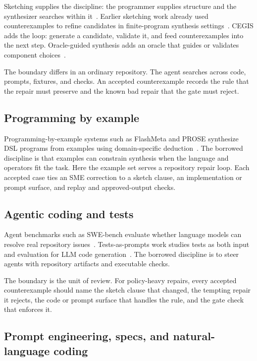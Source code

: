 \documentclass[11pt]{article}
\begin{document}
Sketching supplies the discipline: the programmer supplies structure and the
synthesizer searches within it~\cite{solar2008sketching,solar2013sketching}.  Earlier
sketching work already used counterexamples to refine candidates in finite-program synthesis
settings~\cite{solar2006combinatorial}.  CEGIS adds the loop: generate a candidate, validate it,
and feed counterexamples into the next step.  Oracle-guided synthesis adds an oracle that guides
or validates component choices~\cite{jha2010oracle}.

The boundary differs in an ordinary repository.  The agent searches across code, prompts,
fixtures, and checks.  An accepted counterexample records the rule that the repair must preserve
and the known bad repair that the gate must reject.

\subsection{Programming by example}

Programming-by-example systems such as FlashMeta and PROSE synthesize DSL programs from examples
using domain-specific deduction~\cite{polozov2015flashmeta,gulwani2017program}.  The borrowed
discipline is that examples can constrain synthesis when the language and operators fit the task.
Here the example set serves a repository repair loop.  Each accepted case ties an SME correction
to a sketch clause, an implementation or prompt surface, and replay and approved-output checks.

\subsection{Agentic coding and tests}

Agent benchmarks such as SWE-bench evaluate whether language models can resolve real repository
issues~\cite{jimenez2024swebench}.  Tests-as-prompts work studies tests as both input and
evaluation for LLM code generation~\cite{cui2025tests}.  The borrowed discipline is to steer
agents with repository artifacts and executable checks.

The boundary is the unit of review.  For policy-heavy repairs, every accepted counterexample
should name the sketch clause that changed, the tempting repair it rejects, the code or prompt
surface that handles the rule, and the gate check that enforces it.

\subsection{Prompt engineering, specs, and natural-language coding}
\end{document}
